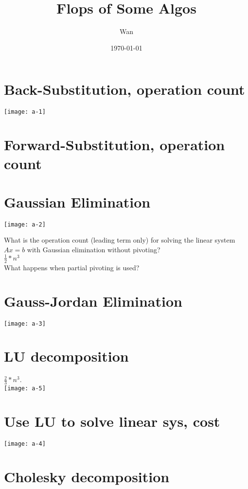 \documentclass{article}
\begin{document}
\title{Flops of Some Algos}
\author{Wan}
\date{\today}
\maketitle

\section*{Back-Substitution, operation count}
\texttt{[image: a-1]}

\section*{Forward-Substitution, operation count}

\pagebreak
\section*{Gaussian Elimination}
\texttt{[image: a-2]}

\noindent
What is the operation count (leading term only) for solving the linear system $Ax = b$
with Gaussian elimination without pivoting?\\
$\frac{1}{2} * n^3$\\

\noindent
What happens when partial pivoting is used?

\pagebreak
\section*{Gauss-Jordan Elimination}
\texttt{[image: a-3]}

\pagebreak
\section*{LU decomposition}
$\frac{2}{3} * n^3$.\\
\texttt{[image: a-5]}

\pagebreak
\section*{Use LU to solve linear sys, cost}
\texttt{[image: a-4]}

\pagebreak
\section*{Cholesky decomposition}
\end{document}
